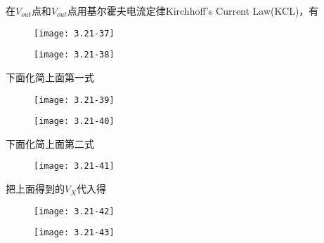 在$V_{out}$点和$V_{out}$点用基尔霍夫电流定律Kirchhoff’s Current Law(KCL)，有

\begin{figure}[H] %
	\begin{minipage}{\linewidth}
		\texttt{[image: 3.21-37]}
	\end{minipage}
\end{figure}

\begin{figure}[H] %
	\begin{minipage}{\linewidth}
		\texttt{[image: 3.21-38]}
	\end{minipage}
\end{figure}

下面化简上面第一式

\begin{figure}[H] %
	\begin{minipage}{\linewidth}
		\texttt{[image: 3.21-39]}
	\end{minipage}
\end{figure}

\begin{figure}[H] %
	\begin{minipage}{\linewidth}
		\texttt{[image: 3.21-40]}
	\end{minipage}
\end{figure}

下面化简上面第二式

\begin{figure}[H] %
	\begin{minipage}{\linewidth}
		\texttt{[image: 3.21-41]}
	\end{minipage}
\end{figure}

把上面得到的$V_X$代入得

\begin{figure}[H] %
	\begin{minipage}{\linewidth}
		\texttt{[image: 3.21-42]}
	\end{minipage}
\end{figure}

\begin{figure}[H] %
	\begin{minipage}{\linewidth}
		\texttt{[image: 3.21-43]}
	\end{minipage}
\end{figure}

